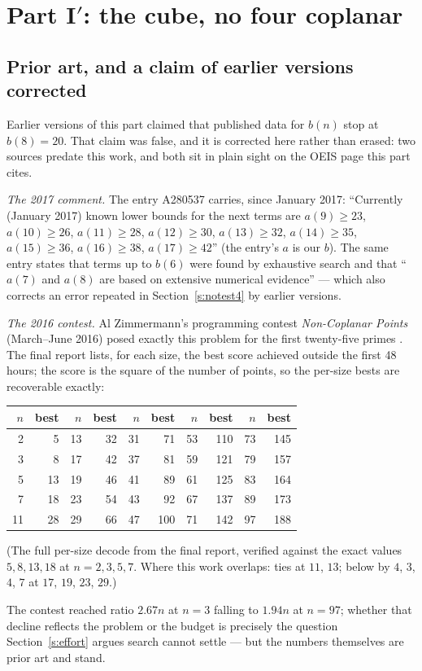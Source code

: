 \documentclass[11pt,a4paper]{article}
\begin{document}
\section{Part I\texorpdfstring{$'$}{'}: the cube, no four coplanar}\label{s:cube4}

\subsection{Prior art, and a claim of earlier versions corrected}\label{s:prior3d}
Earlier versions of this part claimed that published data for $b(n)$ stop at $b(8)=20$.  That claim was false, and it is
corrected here rather than erased: two sources predate this work, and both sit in plain sight on the OEIS page this part cites.

\emph{The 2017 comment.}  The entry A280537 carries, since January 2017: ``Currently (January
2017) known lower bounds for the next terms are $a(9)\ge23$, $a(10)\ge26$, $a(11)\ge28$,
$a(12)\ge30$, $a(13)\ge32$, $a(14)\ge35$, $a(15)\ge36$, $a(16)\ge38$, $a(17)\ge42$''
\cite{OEISA280537} (the entry's $a$ is our $b$).  The same entry states that terms up to $b(6)$ were found by exhaustive
search and that ``$a(7)$ and $a(8)$ are based on extensive numerical evidence'' --- which also
corrects an error repeated in Section~\ref{s:notest4} by earlier versions.

\emph{The 2016 contest.}  Al Zimmermann's programming contest \emph{Non-Coplanar Points}
(March--June 2016) posed exactly this problem for the first twenty-five primes \cite{AZsPCs}.
The final report lists, for each size, the best score achieved outside the first 48 hours; the
score is the square of the number of points, so the per-size bests are recoverable exactly:
\begin{center}
\begin{tabular}{rr|rr|rr|rr|rr}
\toprule
$n$ & best & $n$ & best & $n$ & best & $n$ & best & $n$ & best\\
\midrule
 2 &   5 & 13 &  32 & 31 &  71 & 53 & 110 & 73 & 145\\
 3 &   8 & 17 &  42 & 37 &  81 & 59 & 121 & 79 & 157\\
 5 &  13 & 19 &  46 & 41 &  89 & 61 & 125 & 83 & 164\\
 7 &  18 & 23 &  54 & 43 &  92 & 67 & 137 & 89 & 173\\
11 &  28 & 29 &  66 & 47 & 100 & 71 & 142 & 97 & 188\\
\bottomrule
\end{tabular}

\smallskip
{\small (The full per-size decode from the final report, verified against the exact values $5,8,13,18$
at $n=2,3,5,7$.  Where this work overlaps: ties at $11$, $13$; below by $4$, $3$, $4$, $7$ at $17$, $19$,
$23$, $29$.)}
\end{center}
The contest reached ratio $2.67n$ at $n=3$ falling to $1.94n$ at $n=97$; whether that decline
reflects the problem or the budget is precisely the question Section~\ref{s:effort} argues
search cannot settle --- but the numbers themselves are prior art and stand.
\end{document}
